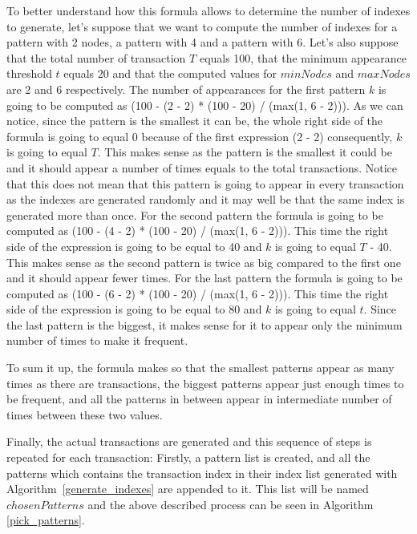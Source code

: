 \documentclass{acm_proc_article-sp-sigmod09}
\begin{document}
To better understand how this formula allows to determine the number of indexes to generate, let's suppose that we want to compute the number of indexes for a pattern with 2 nodes, a pattern with 4 and a pattern with 6. Let's also suppose that the total number of transaction $T$ equals 100, that the minimum appearance threshold $t$ equals 20 and that the computed values for $minNodes$ and $maxNodes$ are 2 and 6 respectively. The number of appearances for the first pattern $k$ is going to be computed as (100 - (2 - 2) * (100 - 20) / (max(1, 6 - 2))). As we can notice, since the pattern is the smallest it can be, the whole right side of the formula is going to equal 0 because of the first expression (2 - 2) consequently, $k$ is going to equal $T$. This makes sense as the pattern is the smallest it could be and it should appear a number of times equals to the total transactions. Notice that this does not mean that this pattern is going to appear in every transaction as the indexes are generated randomly and it may well be that the same index is generated more than once. For the second pattern the formula is going to be computed as (100 - (4 - 2) * (100 - 20) / (max(1, 6 - 2))). This time the right side of the expression is going to be equal to 40 and $k$ is going to equal $T$ - 40. This makes sense as the second pattern is twice as big compared to the first one and it should appear fewer times. For the last pattern the formula is going to be computed as (100 - (6 - 2) * (100 - 20) / (max(1, 6 - 2))). This time the right side of the expression is going to be equal to 80 and $k$ is going to equal $t$. Since the last pattern is the biggest, it makes sense for it to appear only the minimum number of times to make it frequent.

To sum it up, the formula makes so that the smallest patterns appear as many times as there are transactions, the biggest patterns appear just enough times to be frequent, and all the patterns in between appear in intermediate number of times between these two values.

Finally, the actual transactions are generated and this sequence of steps is repeated for each transaction: Firstly, a pattern list is created, and all the patterns which contains the transaction index in their index list generated with Algorithm~\ref{generate_indexes} are appended to it. This list will be named $chosenPatterns$ and the above described process can be seen in Algorithm \ref{pick_patterns}.
\end{document}
